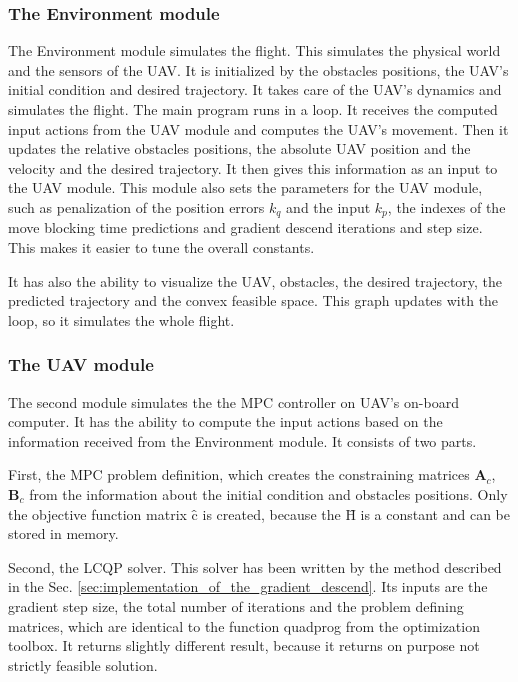 \documentclass[a4paper,11pt,titlepage]{article}
\newcommand{\macHr}{\textbf{\^H}}
\newcommand{\maccr}{\textbf{\^c}}
\begin{document}
\subsubsection{The Environment module}

The Environment module simulates the flight. This simulates the physical world and the sensors of the UAV. It is initialized by the obstacles positions, the UAV's initial condition and desired trajectory. It takes care of the UAV's dynamics and simulates the flight. The main program runs in a loop. It receives the computed input actions from the UAV module and computes the UAV's movement. Then it updates the relative obstacles positions, the absolute UAV position and the velocity and the desired trajectory. It then gives this information as an input to the UAV module. 
This module also sets the parameters for the UAV module, such as penalization of the position errors $k_q$ and the input $k_p$, the indexes of the move blocking time predictions and gradient descend iterations and step size. This makes it easier to tune the overall constants.

It has also the ability to visualize the UAV, obstacles, the desired trajectory, the predicted trajectory and the convex feasible space. This graph updates with the loop, so it simulates the whole flight. 

\subsubsection{The UAV module}

The second module simulates the the MPC controller on UAV's on-board computer. It has the ability to compute the input actions based on the information received from the Environment module. It consists of two parts. 

First, the MPC problem definition, which creates the constraining matrices $\textbf{A}_c$, $\textbf{B}_c$ from the information about the initial condition and obstacles positions. Only the objective function matrix $\maccr$ is created, because the $\macHr$ is a constant and can be stored in memory.

Second, the LCQP solver. This solver has been written by the method described in the Sec. \ref{sec:implementation_of_the_gradient_descend}. Its inputs are the gradient step size, the total number of iterations and the problem defining matrices, which are identical to the function quadprog from the optimization toolbox. It returns slightly different result, because it returns on purpose not strictly feasible solution. 
\end{document}
